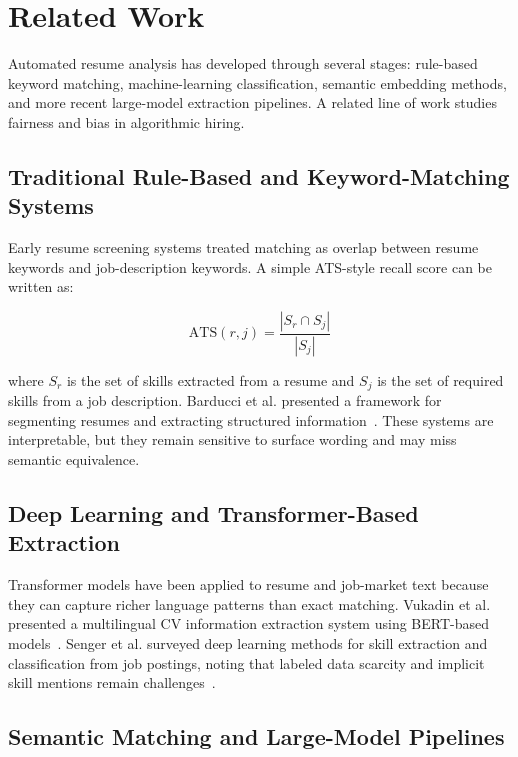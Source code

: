 \documentclass[sigconf, authorversion, nonacm]{acmart}
\begin{document}
\section{Related Work}

Automated resume analysis has developed through several stages: rule-based keyword matching, machine-learning classification, semantic embedding methods, and more recent large-model extraction pipelines. A related line of work studies fairness and bias in algorithmic hiring.

\subsection{Traditional Rule-Based and Keyword-Matching Systems}

Early resume screening systems treated matching as overlap between resume keywords and job-description keywords. A simple ATS-style recall score can be written as:

\begin{equation}
    \text{ATS}(r, j) = \frac{|S_r \cap S_j|}{|S_j|}
\end{equation}

\noindent where $S_r$ is the set of skills extracted from a resume and $S_j$ is the set of required skills from a job description. Barducci et al. presented a framework for segmenting resumes and extracting structured information~\cite{barducci2022}. These systems are interpretable, but they remain sensitive to surface wording and may miss semantic equivalence.

\subsection{Deep Learning and Transformer-Based Extraction}

Transformer models have been applied to resume and job-market text because they can capture richer language patterns than exact matching. Vukadin et al. presented a multilingual CV information extraction system using BERT-based models~\cite{vukadin2021}. Senger et al. surveyed deep learning methods for skill extraction and classification from job postings, noting that labeled data scarcity and implicit skill mentions remain challenges~\cite{senger2024}.

\subsection{Semantic Matching and Large-Model Pipelines}
\end{document}
